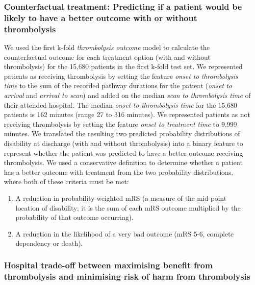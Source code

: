 \subsubsection{Counterfactual treatment: Predicting if a patient would be likely to have a better outcome with or without thrombolysis}

We used the first k-fold \textit{thrombolysis outcome} model to calculate the counterfactual outcome for each treatment option (with and without thrombolysis) for the 15,680 patients in the first k-fold test set. We represented patients as receiving thrombolysis by setting the feature \textit{onset to thrombolysis time} to the sum of the recorded pathway durations for the patient (\textit{onset to arrival} and \textit{arrival to scan}) and added on the median \textit{scan to thrombolysis time} of their attended hospital. The median \textit{onset to thrombolysis time} for the 15,680 patients is 162 minutes (range 27 to 316 minutes). We represented patients as not receiving thrombolysis by setting the feature \textit{onset to treatment time} to 9,999 minutes. We translated the resulting two predicted probability distributions of disability at discharge (with and without thrombolysis) into a binary feature to represent whether the patient was predicted to have a better outcome receiving thrombolysis. We used a conservative definition to determine whether a patient has a better outcome with treatment from the two probability distributions, where both of these criteria must be met: 

\begin{enumerate}
    \item A reduction in probability-weighted mRS (a measure of the mid-point location of disability; it is the sum of each mRS outcome multiplied by the probability of that outcome occurring).
    \item A reduction in the likelihood of a very bad outcome (mRS 5-6, complete dependency or death).
\end{enumerate}

\subsubsection{Hospital trade-off between maximising benefit from thrombolysis and minimising risk of harm from thrombolysis}

